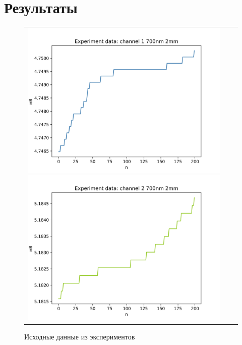 \section{Результаты}

\begin{figure}[H]
	\begin{tabular}{ccc}
		\includegraphics[scale=0.5]{resources/input_PR1.png}
		\includegraphics[scale=0.5]{resources/input_PR2.png}
	\end{tabular}
	\caption{Исходные данные из экспериментов} 
\end{figure}

